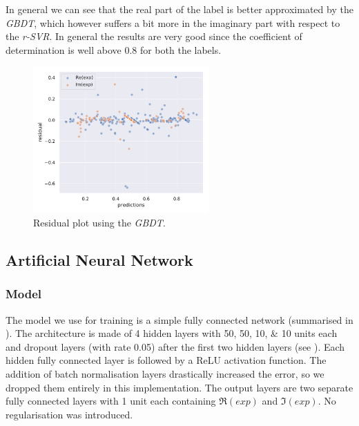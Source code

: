 In general we can see that the real part of the label is better approximated by the \emph{GBDT}, which however suffers a bit more in the imaginary part with respect to the \emph{r-SVR}.
In general the results are very good since the coefficient of determination \rr is well above \num{0.8} for both the labels.

\begin{figure}[htbp]
  \centering
  \includegraphics[width=0.6\textwidth]{img/gbdt_test_res_plot}
  \caption{Residual plot using the \emph{GBDT}.}
  \label{fig:agg:gbdt_res_plot}
\end{figure}


\subsection{Artificial Neural Network}

\subsubsection{Model}

The model we use for training is a simple fully connected network (summarised in ).
The architecture is made of 4 hidden layers with \numlist{50;50;10;10} units each and dropout layers (with rate \num{0.05}) after the first two hidden layers (see ).
Each hidden fully connected layer is followed by a ReLU activation function.
The addition of batch normalisation layers drastically increased the error, so we dropped them entirely in this implementation.
The output layers are two separate fully connected layers with 1 unit each containing $\Re(exp)$ and $\Im(exp)$.
No regularisation was introduced.

